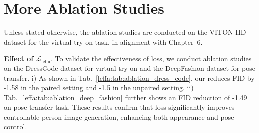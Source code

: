 \begin{table}[!t]
\centering
\setlength{\tabcolsep}{0.5cm}
\caption{Ablation study on the DeepFashion dataset for pose transfer.
Our \leffa{} loss significantly improves model performance.
}
\label{leffa:tab:ablation_deep_fashion}
\end{table}



\section{More Ablation Studies}
Unless stated otherwise, the ablation studies are conducted on the VITON-HD dataset for the virtual try-on task, in alignment with Chapter~6.

\noindent \textbf{Effect of $\mathcal{L}_\text{leffa}$}.
To validate the effectiveness of \leffa{} loss, we conduct ablation studies on the DressCode dataset for virtual try-on and the DeepFashion dataset for pose transfer.
i) As shown in Tab.~\ref{leffa:tab:ablation_dress_code}, our \leffa{} reduces FID by -1.58 in the paired setting and -1.5 in the unpaired setting.
ii) Tab.~\ref{leffa:tab:ablation_deep_fashion} further shows an FID reduction of -1.49 on pose transfer task.
These results confirm that \leffa{} loss significantly improves controllable person image generation, enhancing both appearance and pose control.



